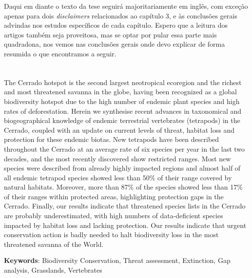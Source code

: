 \documentclass[12pt,openright,oneside,a4paper,english]{abntex2}
\begin{document}
Daqui em diante o texto da tese seguirá majoritariamente em inglês, com exceção apenas para dois \textit{disclaimers} relacionados ao capítulo 3, e às conclusões gerais advindas nos estudos específicos de cada capítulo. Espero que a leitura dos artigos também seja proveitosa, mas se optar por pular essa parte mais quadradona, nos vemos nas conclusões gerais onde devo explicar de forma resumida o que encontramos a seguir.


\linenumbers

\chapter[Hotspot getting hotter]{}\label{chap1}

\begin{resumo}
\noindent
The Cerrado hotspot is the second largest neotropical ecoregion and the richest and most threatened savanna in the globe, having been recognized as a global biodiversity hotspot due to the high number of endemic plant species and high rates of deforestation. Herein we synthesise recent advances in taxonomical and biogeographical knowledge of endemic terrestrial vertebrates (tetrapods) in the Cerrado, coupled with an update on current levels of threat, habitat loss and protection for these endemic biotas. New tetrapods have been described throughout the Cerrado at an average rate of six species per year in the last two decades, and the most recently discovered show restricted ranges. Most new species were described from already highly impacted regions and almost half of all endemic tetrapod species showed less than 50\% of their range covered by natural habitats. Moreover, more than 87\% of the species showed less than 17\% of their ranges within protected areas, highlighting protection gaps in the Cerrado. Finally, our results indicate that threatened species lists in the Cerrado are probably underestimated, with high numbers of data-deficient species impacted by habitat loss and lacking protection. Our results indicate that urgent conservation action is badly needed to halt biodiversity loss in the most threatened savanna of the World.

\vspace{\medskipamount}
\noindent
\textbf{Keywords}: Biodiversity Conservation, Threat assessment, Extinction, Gap analysis, Grasslands, Vertebrates

\end{resumo}
\end{document}
